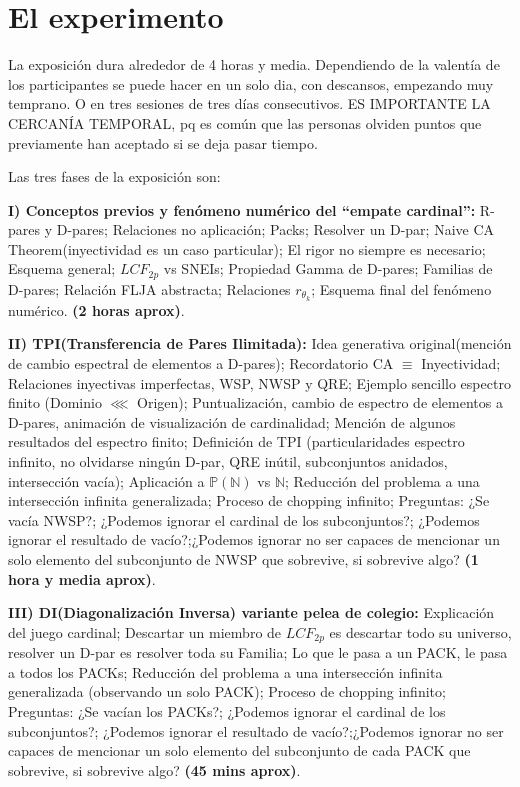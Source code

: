 \chapter{El experimento}

\noindent
La exposición dura alrededor de 4 horas y media. Dependiendo de la valentía de los participantes se puede hacer en un solo dia, con descansos, empezando muy temprano. O en tres sesiones de tres días consecutivos. ES IMPORTANTE LA CERCANÍA TEMPORAL, pq es común que las personas olviden puntos que previamente han aceptado si se deja pasar tiempo.


\noindent
Las tres fases de la exposición son:


\noindent
\textbf{I) Conceptos previos y fenómeno numérico del ``empate cardinal'':} R-pares y D-pares; Relaciones no aplicación; Packs; Resolver un D-par; Naive CA Theorem(inyectividad es un caso particular); El rigor no siempre es necesario; Esquema general; $LCF_{2p}$ vs SNEIs; Propiedad Gamma de D-pares; Familias de D-pares; Relación FLJA abstracta; Relaciones $r_{\theta_{k}}$; Esquema final del fenómeno numérico. \textbf{(2 horas aprox)}.


\noindent
\textbf{II) TPI(Transferencia de Pares Ilimitada):} Idea generativa original(mención de cambio espectral de elementos a D-pares); Recordatorio CA $\equiv$ Inyectividad; Relaciones inyectivas imperfectas, WSP, NWSP y QRE; Ejemplo sencillo espectro finito (Dominio $\lll$ Origen); Puntualización, cambio de espectro de elementos a D-pares, animación de visualización de cardinalidad; Mención de algunos resultados del espectro finito; Definición de TPI (particularidades espectro infinito, no olvidarse ningún D-par, QRE inútil, subconjuntos anidados, intersección vacía); Aplicación a $\mathbb{P(N)}$ vs $\mathbb{N}$; Reducción del problema a una intersección infinita generalizada; Proceso de chopping infinito; Preguntas: ¿Se vacía NWSP?; ¿Podemos ignorar el cardinal de los subconjuntos?; ¿Podemos ignorar el resultado de vacío?;¿Podemos ignorar no ser capaces de mencionar un solo elemento del subconjunto de NWSP que sobrevive, si sobrevive algo? \textbf{(1 hora y media aprox)}.


\noindent
\textbf{III) DI(Diagonalización Inversa) variante pelea de colegio:} Explicación del juego cardinal; Descartar un miembro de $LCF_{2p}$ es descartar todo su universo, resolver un D-par es resolver toda su Familia; Lo que le pasa a un PACK, le pasa a todos los PACKs; Reducción del problema a una intersección infinita generalizada (observando un solo PACK); Proceso de chopping infinito; Preguntas: ¿Se vacían los PACKs?; ¿Podemos ignorar el cardinal de los subconjuntos?; ¿Podemos ignorar el resultado de vacío?;¿Podemos ignorar no ser capaces de mencionar un solo elemento del subconjunto de cada PACK que sobrevive, si sobrevive algo? \textbf{(45 mins aprox)}.


